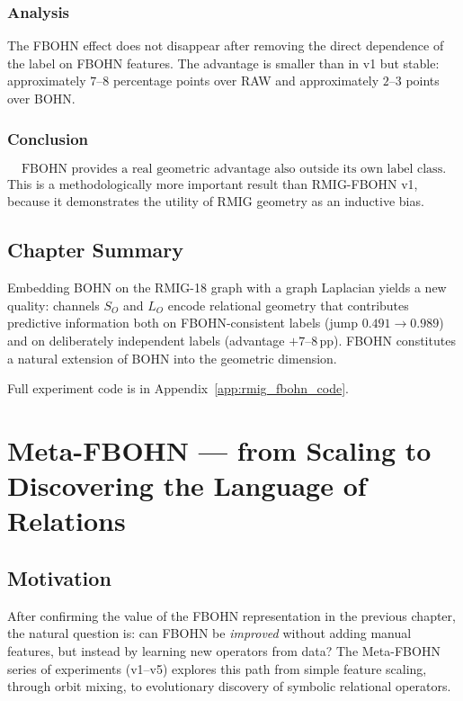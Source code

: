 \documentclass[11pt,a4paper]{report}
\begin{document}
\subsection{Analysis}
The FBOHN effect does not disappear after removing the direct dependence of the label on FBOHN features. The advantage is smaller than in v1 but stable: approximately $7$--$8$ percentage points over RAW and approximately $2$--$3$ points over BOHN.

\subsection{Conclusion}
\[
\boxed{\text{FBOHN provides a real geometric advantage also outside its own label class.}}
\]
This is a methodologically more important result than RMIG-FBOHN v1, because it demonstrates the utility of RMIG geometry as an inductive bias.

\section{Chapter Summary}

Embedding BOHN on the RMIG-18 graph with a graph Laplacian yields a new quality: channels $S_O$ and $L_O$ encode relational geometry that contributes predictive information both on FBOHN-consistent labels (jump $0.491\to 0.989$) and on deliberately independent labels (advantage $+7$--$8$\,pp). FBOHN constitutes a natural extension of BOHN into the geometric dimension.

Full experiment code is in Appendix~\ref{app:rmig_fbohn_code}.


\chapter{Meta-FBOHN --- from Scaling to Discovering the Language of Relations}
\label{ch:meta_fbohn}

\section{Motivation}

After confirming the value of the FBOHN representation in the previous chapter, the natural question is: can FBOHN be \emph{improved} without adding manual features, but instead by learning new operators from data? The Meta-FBOHN series of experiments (v1--v5) explores this path from simple feature scaling, through orbit mixing, to evolutionary discovery of symbolic relational operators.
\end{document}
